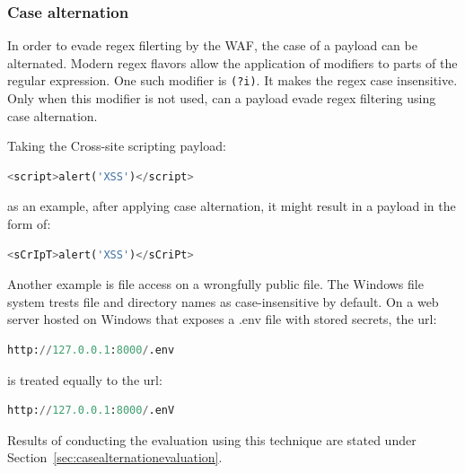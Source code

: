 \subsubsection{Case alternation}
In order to evade regex filerting by the WAF, the case of a payload can be alternated. \cite{medium/allypetitt}
Modern regex flavors allow the application of modifiers to parts of the regular expression.
One such modifier is \verb|(?i)|. It makes the regex case insensitive. \cite{regex/jan} Only when this modifier is not used, can a payload evade regex filtering using case alternation.

Taking the Cross-site scripting payload:

\begin{lstlisting}[style=basicStyle, language=Python]
<script>alert('XSS')</script>
\end{lstlisting}

as an example, after applying case alternation, it might result in a payload in the form of:

\begin{lstlisting}[style=basicStyle, language=Python]
<sCrIpT>alert('XSS')</sCriPt>
\end{lstlisting}

Another example is file access on a wrongfully public file.
The Windows file system trests file and directory names as case-insensitive by default. \cite{windows/casesensitive}
On a web server hosted on Windows that exposes a .env file with stored secrets, the url:

\begin{lstlisting}[style=basicStyle, language=Python]
http://127.0.0.1:8000/.env
\end{lstlisting}

is treated equally to the url:

\begin{lstlisting}[style=basicStyle, language=Python]
http://127.0.0.1:8000/.enV
\end{lstlisting}

Results of conducting the evaluation using this technique are stated under Section~\ref{sec:casealternationevaluation}.




